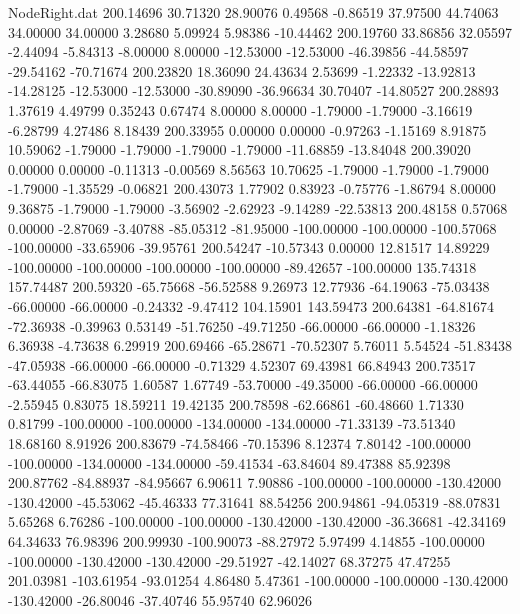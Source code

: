\begin{filecontents}{NodeRight.dat}
 200.14696   30.71320   28.90076     0.49568   -0.86519   37.97500   44.74063   34.00000   34.00000    3.28680    5.09924    5.98386  -10.44462
 200.19760   33.86856   32.05597    -2.44094   -5.84313   -8.00000    8.00000  -12.53000  -12.53000  -46.39856  -44.58597  -29.54162  -70.71674
 200.23820   18.36090   24.43634     2.53699   -1.22332  -13.92813  -14.28125  -12.53000  -12.53000  -30.89090  -36.96634   30.70407  -14.80527
 200.28893    1.37619    4.49799     0.35243    0.67474    8.00000    8.00000   -1.79000   -1.79000   -3.16619   -6.28799    4.27486    8.18439
 200.33955    0.00000    0.00000    -0.97263   -1.15169    8.91875   10.59062   -1.79000   -1.79000   -1.79000   -1.79000  -11.68859  -13.84048
 200.39020    0.00000    0.00000    -0.11313   -0.00569    8.56563   10.70625   -1.79000   -1.79000   -1.79000   -1.79000   -1.35529   -0.06821
 200.43073    1.77902    0.83923    -0.75776   -1.86794    8.00000    9.36875   -1.79000   -1.79000   -3.56902   -2.62923   -9.14289  -22.53813
 200.48158    0.57068    0.00000    -2.87069   -3.40788  -85.05312  -81.95000 -100.00000 -100.00000 -100.57068 -100.00000  -33.65906  -39.95761
 200.54247  -10.57343    0.00000    12.81517   14.89229 -100.00000 -100.00000 -100.00000 -100.00000  -89.42657 -100.00000  135.74318  157.74487
 200.59320  -65.75668  -56.52588     9.26973   12.77936  -64.19063  -75.03438  -66.00000  -66.00000   -0.24332   -9.47412  104.15901  143.59473
 200.64381  -64.81674  -72.36938    -0.39963    0.53149  -51.76250  -49.71250  -66.00000  -66.00000   -1.18326    6.36938   -4.73638    6.29919
 200.69466  -65.28671  -70.52307     5.76011    5.54524  -51.83438  -47.05938  -66.00000  -66.00000   -0.71329    4.52307   69.43981   66.84943
 200.73517  -63.44055  -66.83075     1.60587    1.67749  -53.70000  -49.35000  -66.00000  -66.00000   -2.55945    0.83075   18.59211   19.42135
 200.78598  -62.66861  -60.48660     1.71330    0.81799 -100.00000 -100.00000 -134.00000 -134.00000  -71.33139  -73.51340   18.68160    8.91926
 200.83679  -74.58466  -70.15396     8.12374    7.80142 -100.00000 -100.00000 -134.00000 -134.00000  -59.41534  -63.84604   89.47388   85.92398
 200.87762  -84.88937  -84.95667     6.90611    7.90886 -100.00000 -100.00000 -130.42000 -130.42000  -45.53062  -45.46333   77.31641   88.54256
 200.94861  -94.05319  -88.07831     5.65268    6.76286 -100.00000 -100.00000 -130.42000 -130.42000  -36.36681  -42.34169   64.34633   76.98396
 200.99930 -100.90073  -88.27972     5.97499    4.14855 -100.00000 -100.00000 -130.42000 -130.42000  -29.51927  -42.14027   68.37275   47.47255
 201.03981 -103.61954  -93.01254     4.86480    5.47361 -100.00000 -100.00000 -130.42000 -130.42000  -26.80046  -37.40746   55.95740   62.96026

\end{filecontents}
